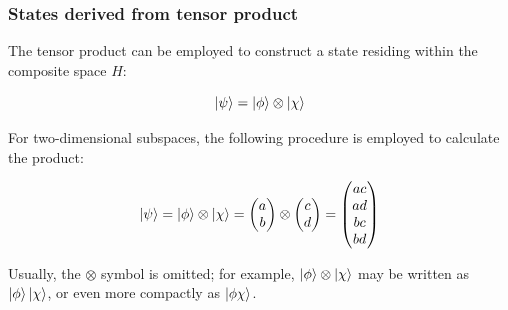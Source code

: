 \documentclass{beamer}
\begin{document}
\begin{frame}
	\frametitle{States derived from tensor product}
	The tensor product can be employed to construct a state residing within the composite space $H$:
	
	\begin{equation}
		\ket{\psi} = \ket{\phi} \otimes \ket{\chi}
		\label{eq:tensor_states}
	\end{equation}
	
	For two-dimensional subspaces, the following procedure is employed to calculate the product:
	
	\begin{equation}
		\ket{\psi} = \ket{\phi} \otimes \ket{\chi} 
		= \begin{pmatrix} 
			a \\ 
			b 
		\end{pmatrix} 
		\otimes
		\begin{pmatrix} 
			c \\ 
			d
		\end{pmatrix} 
		= \begin{pmatrix} 
			ac \\ 
			ad \\
			bc \\
			bd
		\end{pmatrix}
		\label{eq:constr_states}
	\end{equation}

	Usually, the $\otimes$ symbol is omitted; for example, $\ket{\phi} \otimes \ket{\chi}$ may be written as $\ket{\phi} \ket{\chi}$, or even more compactly as $\ket{\phi\chi}$.
	
\end{frame}
\end{document}
